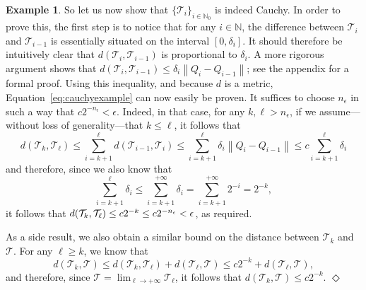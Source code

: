 \documentclass[10pt,a4paper]{paper}
\theoremstyle{definition}
\newtheorem{exmp}{Example}%
\newcommand{\nats}{\mathbb{N}}
\newcommand{\norm}[1]{\left\lVert #1 \right\rVert}
\newcommand{\coloneqq}{:\!=}
\newcommand{\exampleend}{\hfill$\Diamond$}
\begin{document}
\begin{exmp}
So let us now show that $\{\mathcal{T}_i\}_{i\in\nats_0}$ is indeed Cauchy. In order to prove this, the first step is to notice that for any $i\in\nats$, the difference between $\mathcal{T}_{i}$ and $\mathcal{T}_{i-1}$ is essentially situated on the interval $[0,\delta_i]$. It should therefore be intuitively clear that $d(\mathcal{T}_i,\mathcal{T}_{i-1})$ is proportional to $\delta_i$. A more rigorous argument shows that $d(\mathcal{T}_i,\mathcal{T}_{i-1})\leq\delta_i\norm{Q_i-Q_{i-1}}$; see the appendix for a formal proof.
Using this inequality, and because $d$ is a metric, Equation~\eqref{eq:cauchyexample} can now easily be proven. It suffices to choose $n_\epsilon$ in such a way that $c2^{-n_\epsilon}<\epsilon$. Indeed, in that case, for any $k,\ell>n_\epsilon$, if we assume---without loss of generality---that $k\leq\ell$, it follows that
 \begin{equation*}
d(\mathcal{T}_{k},\mathcal{T}_\ell)
\leq\sum_{i=k+1}^{\ell}d(\mathcal{T}_{i-1},\mathcal{T}_i)
\leq\sum_{i=k+1}^{\ell}\delta_i\norm{Q_i-Q_{i-1}}
\leq c\sum_{i=k+1}^{\ell}\delta_i
 \end{equation*}
and therefore, since we also know that
\begin{equation*}
\sum_{i=k+1}^{\ell}\delta_i
\leq
\sum_{i=k+1}^{+\infty}\delta_i
=\sum_{i=k+1}^{+\infty}2^{-i}
=2^{-k},
\end{equation*}
it follows that $\smash{d(\mathcal{T}_{k},\mathcal{T}_\ell)\leq c 2^{-k}\leq c 2^{-n_\epsilon}}<\epsilon$, as required.

As a side result, we also obtain a similar bound on the distance between $\mathcal{T}_k$ and $\mathcal{T}$. For any $\ell\geq k$, we know that
\begin{equation*}
d(\mathcal{T}_k,\mathcal{T})
\leq d(\mathcal{T}_k,\mathcal{T}_\ell)+d(\mathcal{T}_\ell,\mathcal{T})\leq c 2^{-k}+d(\mathcal{T}_\ell,\mathcal{T}),
\end{equation*}
and therefore, since $\mathcal{T}=\lim_{\ell\to+\infty}\mathcal{T}_\ell$, it follows that $d(\mathcal{T}_k,\mathcal{T})\leq c 2^{-k}$.
\exampleend
\end{exmp}
\end{document}
